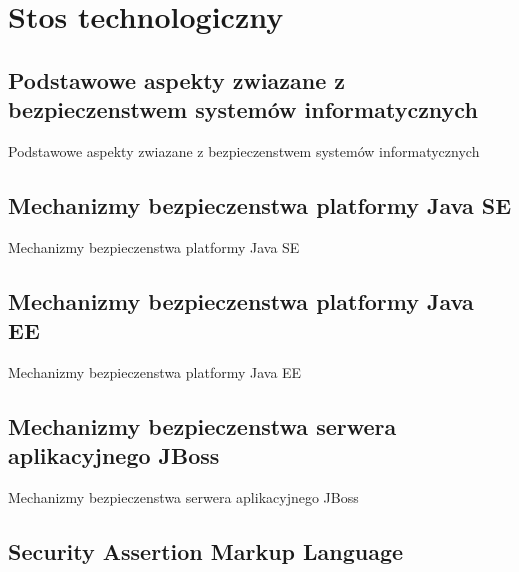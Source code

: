 \chapter{Stos technologiczny}
\label{cha:stosTechnologiczny}


\section{Podstawowe aspekty zwiazane z bezpieczenstwem systemów informatycznych}
\label{sec:aspektyBezpieczenstwa}

Podstawowe aspekty zwiazane z bezpieczenstwem systemów informatycznych


\section{Mechanizmy bezpieczenstwa platformy Java SE}
\label{sec:javaSE}

Mechanizmy bezpieczenstwa platformy Java SE



\section{Mechanizmy bezpieczenstwa platformy Java EE}
\label{sec:javaEE}

Mechanizmy bezpieczenstwa platformy Java EE


\section{Mechanizmy bezpieczenstwa serwera aplikacyjnego JBoss}
\label{sec:jboss}

Mechanizmy bezpieczenstwa serwera aplikacyjnego JBoss


\section{Security Assertion Markup Language}
\label{sec:saml}

